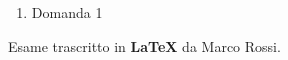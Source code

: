 \documentclass[fleqn]{article}
\begin{document}
\begin{enumerate}
   \item Domanda 1
\end{enumerate}
Esame trascritto in \textbf{\LaTeX} da Marco Rossi.
\end{document}
